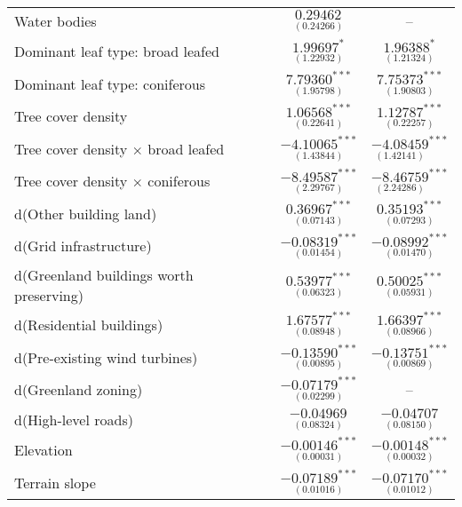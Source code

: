 \begin{ThreePartTable}
\begin{longtable}{l c c}
         Water bodies                                 & $\underset{(0.24266)}{0.29462^{}}$     &  -- \\
         Dominant leaf type: broad leafed             & $\underset{(1.22932)}{1.99697^{*}}$   & $\underset{(1.21324)}{1.96388^{*}}$     \\
         Dominant leaf type: coniferous               & $\underset{(1.95798)}{7.79360^{***}}$  & $\underset{(1.90803)}{7.75373^{***}}$  \\
         Tree cover density                           & $\underset{(0.22641)}{1.06568^{***}}$  & $\underset{(0.22257)}{1.12787^{***}}$ \\
         Tree cover density $\times$ broad leafed     & $\underset{(1.43844)}{-4.10065^{***}}$ & $\underset{(1.42141)}{-4.08459}^{***}$ \\
         Tree cover density $\times$ coniferous       & $\underset{(2.29767)}{-8.49587^{***}}$ & $\underset{(2.24286)}{-8.46759}^{***}$ \\
         d(Other building land)                       & $\underset{(0.07143)}{0.36967^{***}}$  & $\underset{(0.07293)}{0.35193^{***}}$ \\
         d(Grid infrastructure)                       & $\underset{(0.01454)}{-0.08319^{***}}$ & $\underset{(0.01470)}{-0.08992^{***}}$ \\
         d(Greenland buildings worth preserving)      & $\underset{(0.06323)}{0.53977^{***}}$  & $\underset{(0.05931)}{0.50025^{***}}$  \\
         d(Residential buildings)                     & $\underset{(0.08948)}{1.67577^{***}}$  & $\underset{(0.08966)}{1.66397^{***}}$  \\
         d(Pre-existing wind turbines)                & $\underset{(0.00895)}{-0.13590^{***}}$ & $\underset{(0.00869)}{-0.13751^{***}}$ \\
         d(Greenland zoning)                          & $\underset{(0.02299)}{-0.07179^{***}}$ &  --\\
         d(High-level roads)                          & $\underset{(0.08324)}{-0.04969}^{}$    & $\underset{(0.08150)}{-0.04707}$ \\
         Elevation                                    & $\underset{(0.00031)}{-0.00146^{***}}$ & $\underset{(0.00032)}{-0.00148^{***}}$ \\
         Terrain slope                                & $\underset{(0.01016)}{-0.07189^{***}}$ & $\underset{(0.01012)}{-0.07170^{***}}$ \\

\end{longtable}
\end{ThreePartTable}
